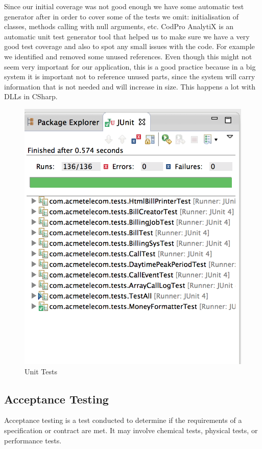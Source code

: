 \documentclass[11pt,twocolumn]{article} %
\begin{document}
Since our initial coverage was not good enough we have some automatic test generator after in order to cover some of the tests we omit: initialisation of classes, methods calling with null arguments, etc. 
CodPro AnalytiX\cite{codePro}  is an automatic unit test generator tool that helped us to make sure we have a very good test coverage and also to spot any small issues with the code. 
For example we identified and removed some unused references. Even though this might not seem very important for our application, this is a good practice because in a 
big system it is important not to reference unused parts, since the system will carry information that is not needed and will increase in size. This happens a lot with DLLs in CSharp. 
\begin{figure}[!ht]
\centering
\includegraphics[scale=0.40]{Screen Shot 2013-11-21 at 18.46.09.png}
\caption{Unit Tests}
\end{figure}

\subsection{Acceptance Testing}
Acceptance testing is a test conducted to determine if the requirements of a specification or contract are met. 
It may involve chemical tests, physical tests, or performance tests.
\end{document}

